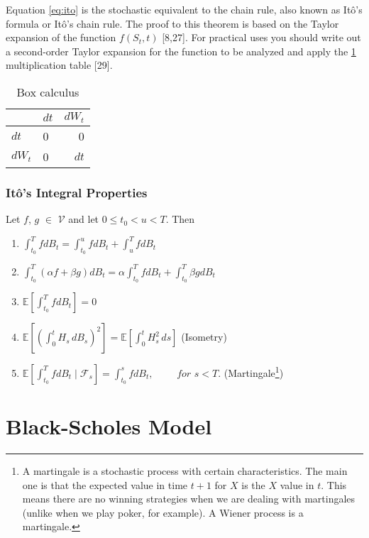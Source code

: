 \documentclass[12pt,twoside]{reedthesis}
\theoremstyle{definition}
\theoremstyle{definition}
\theoremstyle{remark}
\begin{document}
  Equation \eqref{eq:ito} is the stochastic equivalent to the chain rule,
  also known as Itô's formula or Itô's chain rule. The proof to this
  theorem is based on the Taylor expansion of the function \(f(S_t, t)\)
  {[}8,27{]}. For practical uses you should write out a second-order
  Taylor expansion for the function to be analyzed and apply the
  \ref{tab:box-calc} multiplication table {[}29{]}.
  \begin{longtable}[t]{llr}
  \caption{\label{tab:box-calc}Box calculus}\\
  \toprule
    & $dt$ & $dW_t$\\
  \midrule
  $dt$ & 0 & 0\\
  $dW_t$ & 0 & $dt$\\
  \bottomrule
  \end{longtable}
  \subsubsection{Itô's Integral
  Properties}\label{itos-integral-properties}
  
  Let \(f\), \(g\) \(\in\) \(\mathcal{V}\) and let \(0 \leq t_0 < u < T\).
  Then
  \begin{enumerate}[label=(\roman*)]
    \item $\int_{t_0}^{T}{f dB_t} = \int_{t_0}^{u}{f dB_t} + \int_{u}^{T}{f dB_t}$
    \item $\int_{t_0}^{T}{(\alpha f + \beta g) dB_t} = \alpha  \int_{t_0}^{T}{f dB_t} + \int_{t_0}^{T}{ \beta g dB_t}$
    \item $\mathbb{E}\left[ \int_{t_0}^{T}{fdB_t}\right] = 0 $
    \item $\mathbb {E} \left[\left(\int_{0}^{t}H_{s}\,dB_{s}\right)^{2}\right]=\mathbb {E} \left[\int _{0}^{t}H_{s}^{2}\,ds\right]$ (Isometry)
    \item $ \mathbb {E}\left[ \int_{t_0}^{T}{f dB_t \mid \mathcal{F}_{s}} \right] = \int_{t_0}^{s}{f dB_t}, \,\,\,\,\,\,\,\,\,\,\,\,\,\, for \,\, s < T.$  (Martingale\footnote{A martingale is a stochastic process with certain characteristics. The main one is that the expected value in time $t+1$ for $X$ is the $X$ value in $t$. This means there are no winning strategies when we are dealing with martingales (unlike when we play poker, for example). A Wiener process is a martingale.})
  \end{enumerate}
  \section{Black-Scholes Model}\label{black-scholes-model}
  
\end{document}
